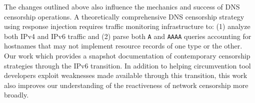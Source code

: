 The changes outlined above also influence the mechanics and success of DNS
censorship operations. A theoretically comprehensive DNS censorship strategy
using response injection requires traffic monitoring infrastructure to: (1)
analyze both IPv4 and IPv6 traffic and (2) parse both \texttt{A} and
\texttt{AAAA} queries accounting for hostnames that may not implement resource
records of one type or the other. 
%
Our work which provides a snapshot documentation of contemporary
censorship strategies through the IPv6 transition. In addition to helping
circumvention tool developers exploit weaknesses made available through this
transition, this work also improves our understanding of the reactiveness of
network censorship more broadly.
% 
% 
% 
% 
